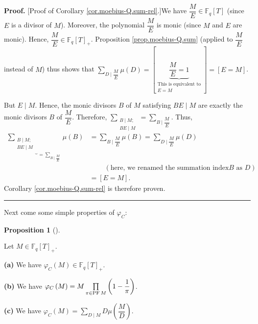 \documentclass[numbers=enddot,12pt,final,onecolumn,notitlepage]{scrartcl}%
\theoremstyle{definition}
\newtheorem{prop}[theo]{Proposition}
\newenvironment{proposition}[1][]
{\begin{prop}[#1]\begin{leftbar}}
{\end{leftbar}\end{prop}}
\newenvironment{proof}[1][Proof]{\noindent\textbf{#1.} }{\ \rule{0.5em}{0.5em}}
\let\sumnonlimits\sum
\let\prodnonlimits\prod
\renewcommand{\sum}{\sumnonlimits\limits}
\renewcommand{\prod}{\prodnonlimits\limits}
\begin{document}
\begin{proof}
[Proof of Corollary \ref{cor.moebius-Q.sum-rel}.]We have $\dfrac{M}{E}%
\in\mathbb{F}_{q}\left[  T\right]  $ (since $E$ is a divisor of $M$).
Moreover, the polynomial $\dfrac{M}{E}$ is monic (since $M$ and $E$ are
monic). Hence, $\dfrac{M}{E}\in\mathbb{F}_{q}\left[  T\right]  _{+}$.
Proposition \ref{prop.moebius-Q.sum} (applied to $\dfrac{M}{E}$ instead of
$M$) thus shows that $\sum_{D\mid\dfrac{M}{E}}\mu\left(  D\right)  =\left[
\underbrace{\dfrac{M}{E}=1}_{\substack{\text{This is equivalent to}%
\\E=M}}\right]  =\left[  E=M\right]  $.

But $E\mid M$. Hence, the monic divisors $B$ of $M$ satisfying $BE\mid M$ are
exactly the monic divisors $B$ of $\dfrac{M}{E}$. Therefore, $\sum
_{\substack{B\mid M;\\BE\mid M}}=\sum_{B\mid\dfrac{M}{E}}$. Thus,%
\begin{align*}
\underbrace{\sum_{\substack{B\mid M;\\BE\mid M}}}_{=\sum_{B\mid\dfrac{M}{E}}%
}\mu\left(  B\right)   &  =\sum_{B\mid\dfrac{M}{E}}\mu\left(  B\right)
=\sum_{D\mid\dfrac{M}{E}}\mu\left(  D\right) \\
&  \ \ \ \ \ \ \ \ \ \ \left(  \text{here, we renamed the summation index
}B\text{ as }D\right) \\
&  =\left[  E=M\right]  .
\end{align*}
Corollary \ref{cor.moebius-Q.sum-rel} is therefore proven.
\end{proof}

Next come some simple properties of $\varphi_{C}$:

\begin{proposition}
\label{prop.phiC-Q.formula}Let $M\in\mathbb{F}_{q}\left[  T\right]  _{+}$.

\textbf{(a)} We have $\varphi_{C}\left(  M\right)  \in\mathbb{F}_{q}\left[
T\right]  _{+}$.

\textbf{(b)} We have $\varphi_{C}\left(  M\right)  =M\prod\limits_{\pi
\in\operatorname*{PF}M}\left(  1-\dfrac{1}{\pi}\right)  $.

\textbf{(c)} We have $\varphi_{C}\left(  M\right)  =\sum_{D\mid M}D\mu\left(
\dfrac{M}{D}\right)  $.
\end{proposition}
\end{document}
